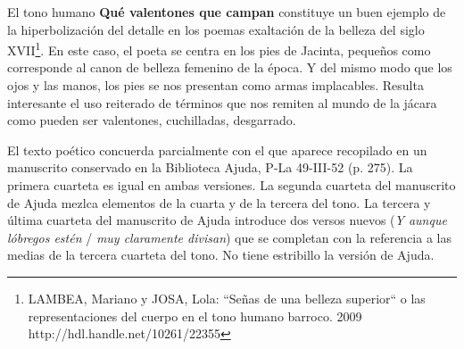 El tono humano \textbf{Qué valentones que campan} constituye un buen ejemplo de la hiperbolización del detalle en los poemas exaltación de la belleza del siglo XVII\footnote{LAMBEA, Mariano y JOSA, Lola: ``Señas de una belleza superior`` o las representaciones del cuerpo en el tono humano barroco. 2009 http://hdl.handle.net/10261/22355}. En este caso, el poeta se centra en los pies de Jacinta, pequeños como corresponde al canon de belleza femenino de la época. Y del mismo modo que los ojos y las manos, los pies se nos presentan como armas implacables. Resulta interesante el uso reiterado de términos que nos remiten al mundo de la jácara como pueden ser valentones, cuchilladas, desgarrado.

El texto poético concuerda parcialmente con el que aparece recopilado en un manuscrito conservado en la Biblioteca Ajuda, P-La 49-III-52 (p. 275). La primera cuarteta es igual en ambas versiones. La segunda cuarteta del manuscrito de Ajuda mezlca elementos de la cuarta y de la tercera del tono. La tercera y última cuarteta del manuscrito de Ajuda introduce dos versos nuevos (\textit{Y aunque lóbregos estén} / \textit{muy claramente divisan}) que se completan con la referencia a las medias de la tercera cuarteta del tono. No tiene estribillo la versión de Ajuda.
